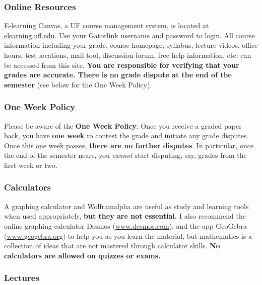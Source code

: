 \documentclass{ximera}
\begin{document}
\subsubsection*{Online Resources}
    E-learning Canvas, a UF course management system, is located at \url{elearning.ufl.edu}.  Use your Gatorlink username and password to login.  All course information including your grade, course homepage, syllabus, lecture videos,  office  hours,  test locations,  mail tool,  discussion forum,  free help information,  etc. can be accessed from this site.  \textbf{You are responsible for verifying that your grades are accurate.  There is no grade dispute at the end of the semester} (see below for the One Week Policy).

\subsubsection*{One Week Policy}

    Please be aware of the \textbf{One Week Policy}: Once you receive a graded paper back, you have \textbf{one week} to contest the grade and initiate any grade disputes. Once this one week passes, \textbf{there are no further disputes}. In particular, once the end of the semester nears, you \textit{cannot} start disputing, say, grades from the first week or two. 


\subsubsection*{Calculators}
    A graphing calculator and Wolframalpha are useful as study and learning tools when used appropriately, \textbf{but they are not essential.}  I also recommend the online graphing calculator Desmos (\url{www.desmos.com}), and the app GeoGebra (\url{www.geogebra.org}) to help you as you learn the material, but mathematics is a collection of ideas that are not mastered through calculator skills.  \textbf{No calculators are allowed on quizzes or exams.}

\subsubsection*{Lectures}
\end{document}
